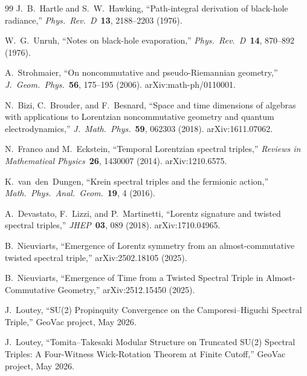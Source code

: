 \documentclass[11pt]{article}
\begin{document}
\begin{thebibliography}{99}
J.~B.~Hartle and S.~W.~Hawking, ``Path-integral derivation of
black-hole radiance,'' \textit{Phys.\ Rev.\ D}\ \textbf{13},
2188--2203 (1976).

W.~G.~Unruh, ``Notes on black-hole evaporation,''
\textit{Phys.\ Rev.\ D}\ \textbf{14}, 870--892 (1976).

A.~Strohmaier, ``On noncommutative and pseudo-Riemannian
geometry,'' \textit{J.\ Geom.\ Phys.}\ \textbf{56}, 175--195
(2006).  arXiv:math-ph/0110001.

N.~Bizi, C.~Brouder, and F.~Besnard, ``Space and time dimensions of
algebras with applications to Lorentzian noncommutative geometry
and quantum electrodynamics,'' \textit{J.\ Math.\ Phys.}\ \textbf{59},
062303 (2018).  arXiv:1611.07062.

N.~Franco and M.~Eckstein, ``Temporal Lorentzian spectral triples,''
\textit{Reviews in Mathematical Physics}\ \textbf{26}, 1430007
(2014).  arXiv:1210.6575.

K.~van~den~Dungen, ``Krein spectral triples and the fermionic
action,'' \textit{Math.\ Phys.\ Anal.\ Geom.}\ \textbf{19}, 4 (2016).

A.~Devastato, F.~Lizzi, and P.~Martinetti, ``Lorentz signature and
twisted spectral triples,'' \textit{JHEP}\ \textbf{03}, 089 (2018).
arXiv:1710.04965.

B.~Nieuviarts, ``Emergence of Lorentz symmetry from an
almost-commutative twisted spectral triple,'' arXiv:2502.18105
(2025).

B.~Nieuviarts, ``Emergence of Time from a Twisted Spectral Triple
in Almost-Commutative Geometry,'' arXiv:2512.15450 (2025).

J.~Loutey, ``SU(2) Propinquity Convergence on the Camporesi--Higuchi
Spectral Triple,'' GeoVac project, May 2026.

J.~Loutey, ``Tomita--Takesaki Modular Structure on Truncated SU(2)
Spectral Triples: A Four-Witness Wick-Rotation Theorem at Finite
Cutoff,'' GeoVac project, May 2026.

\end{thebibliography}
\end{document}
